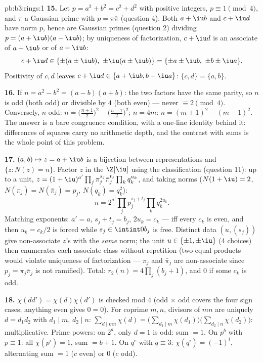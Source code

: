 \begin{solution}{pb:b3:rings:1}
\textbf{15.} Let $p = a^2 + b^2 = c^2 + d^2$ with positive
integers, $p \equiv 1 \pmod 4$, and $\pi$ a Gaussian prime with
$p = \pi\bar\pi$ (question 4). Both $a + \iu b$ and $c + \iu d$
have norm $p$, hence are Gaussian primes (question 2) dividing
$p = (a+\iu b)(a - \iu b)$; by uniqueness of factorization, $c +
\iu d$ is an associate of $a + \iu b$ or of $a - \iu b$:
\[
c + \iu d \in \{\pm(a \pm \iu b),\ \pm\iu(a \pm \iu b)\}
= \{\pm a \pm \iu b,\ \pm b \pm \iu a\}.
\]
Positivity of $c, d$ leaves $c + \iu d \in \{a + \iu b, b + \iu
a\}$: $\{c, d\} = \{a, b\}$.

\textbf{16.} If $n = a^2 - b^2 = (a-b)(a+b)$: the two factors
have the same parity, so $n$ is odd (both odd) or divisible by
$4$ (both even) --- never $\equiv 2 \pmod 4$. Conversely, $n$
odd: $n = \bigl(\frac{n+1}2\bigr)^2 -
\bigl(\frac{n-1}2\bigr)^2$; $n = 4m$: $n = (m+1)^2 - (m-1)^2$.
The answer is a bare congruence condition, with a one-line
identity behind it: differences of squares carry no arithmetic
depth, and the contrast with sums is the whole point of this
problem.

\textbf{17.} $(a, b) \mapsto z = a + \iu b$ is a bijection
between representations and $\{z : N(z) = n\}$. Factor $z$ in
the  $\Z[\iu]$ using the classification (question 11): up to
a unit, $z = (1+\iu)^{a'}\prod_j\pi_j^{s_j}\bar\pi_j^{t_j}
\prod_kq_k^{u_k}$, and taking norms ($N(1+\iu) = 2$,
$N(\pi_j) = N(\bar\pi_j) = p_j$, $N(q_k) = q_k^2$):
\[
n = 2^{a'}\prod_jp_j^{s_j + t_j}\prod_kq_k^{2u_k} .
\]
Matching exponents: $a' = a$, $s_j + t_j = b_j$, $2u_k = c_k$
---  iff every $c_k$ is even, and then $u_k = c_k/2$ is
forced while $s_j \in \intint0{b_j}$ is free. Distinct data
$(u, (s_j))$ give non-associate $z$'s with the \emph{same}
norm; the unit $u \in \{\pm1, \pm\iu\}$ (4 choices) then
enumerates each associate class without repetition (two equal
products would violate uniqueness of factorization ---
$\pi_j$ and $\bar\pi_j$ are non-associate since $p_j =
\pi_j\bar\pi_j$ is not ramified). Total: $r_2(n) =
4\prod_j(b_j + 1)$, and $0$ if some $c_k$ is odd.

\textbf{18.} $\chi(dd') = \chi(d)\chi(d')$ is checked mod $4$
(odd $\times$ odd covers the four sign cases; anything even
gives $0 = 0$). For coprime $m, n$, divisors of $mn$ are
uniquely $d = d_1d_2$ with $d_1 \mid m$, $d_2 \mid n$:
$\sum_{d \mid mn}\chi(d) = \bigl(\sum_{d_1\mid
m}\chi(d_1)\bigr)\bigl(\sum_{d_2\mid n}\chi(d_2)\bigr)$:
multiplicative. Prime powers: on $2^a$, only $d = 1$ is odd:
sum $= 1$. On $p^b$ with $p \equiv 1$: all $\chi(p^i) = 1$,
sum $= b + 1$. On $q^c$ with $q \equiv 3$: $\chi(q^i) =
(-1)^i$, alternating sum $= 1$ ($c$ even) or $0$ ($c$ odd).


\end{solution}
